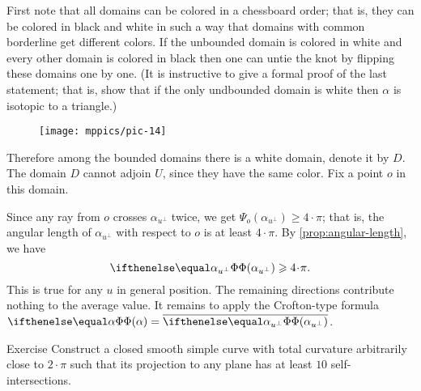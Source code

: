 First note that all domains can be colored in a chessboard order;
that is, they can be colored in black and white in such a way that domains with common borderline get different colors.
If the unbounded domain is colored in white and every other domain is colored in black then one can untie the knot by flipping these domains one by one.
(It is instructive to give a formal proof of the last statement; that is, show that if the only undbounded domain is white then $\alpha$ is isotopic to a triangle.) 


\begin{wrapfigure}{r}{30 mm}
\vskip-4mm
\centering
\texttt{[image: mppics/pic-14]}
\vskip0mm
\end{wrapfigure}

Therefore among the bounded domains there is a white domain, denote it by $D$.
The domain $D$ cannot adjoin %
$U$, since they have the same color.
Fix a point $o$ in this domain.

Since any ray from $o$ crosses $\alpha_{u^\perp}$ twice, we get $\Psi_o(\alpha_{u^\perp})\ge 4\cdot\pi$;
that is, the angular length of $\alpha_{u^\perp}$ with respect to $o$ is at least $4\cdot\pi$. 
By \ref{prop:angular-length}, we have 
\[\tc{\alpha_{u^\perp}}\ge4\cdot\pi.\]
This is true for any $u$ in general position.
The remaining directions contribute nothing to the average value.
It remains to apply the Crofton-type formula $\tc{\alpha}=\overline{\tc{\alpha_{u^\perp}}}$.
\qeds



\begin{thm}{Exercise}
Construct a closed smooth simple curve with total curvature arbitrarily close to $2\cdot\pi$ such that its projection to any plane has at least $10$ self-intersections.   
\end{thm}

